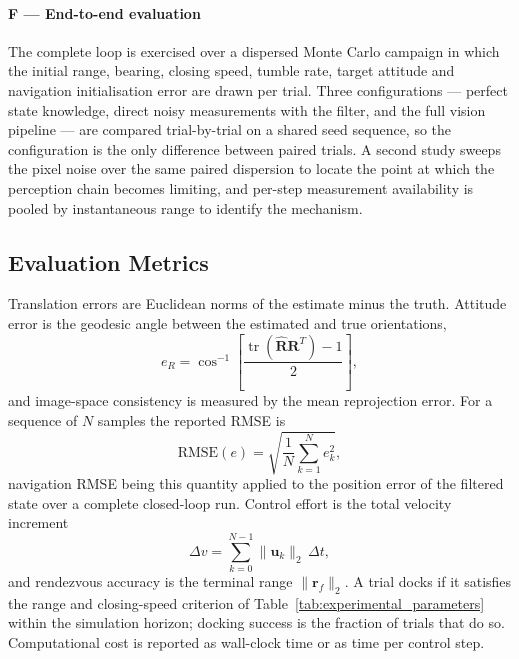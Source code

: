 \paragraph{F --- End-to-end evaluation}
The complete loop is exercised over a dispersed Monte Carlo campaign in which
the initial range, bearing, closing speed, tumble rate, target attitude and
navigation initialisation error are drawn per trial. Three configurations ---
perfect state knowledge, direct noisy measurements with the filter, and the
full vision pipeline --- are compared trial-by-trial on a shared seed
sequence, so the configuration is the only difference between paired trials. A
second study sweeps the pixel noise over the same paired dispersion to locate
the point at which the perception chain becomes limiting, and per-step
measurement availability is pooled by instantaneous range to identify the
mechanism.

\subsection{Evaluation Metrics}

Translation errors are Euclidean norms of the estimate minus the truth.
Attitude error is the geodesic angle between the estimated and true
orientations,
\begin{equation}
    e_{R}
    =
    \cos^{-1}
    \left[
    \frac{\operatorname{tr}(\hat{\mathbf{R}}\mathbf{R}^{T})-1}{2}
    \right],
\end{equation}
and image-space consistency is measured by the mean reprojection error. For a
sequence of $N$ samples the reported RMSE is
\begin{equation}
    \mathrm{RMSE}(e) = \sqrt{\frac{1}{N}\sum_{k=1}^{N}e_k^2},
\end{equation}
navigation RMSE being this quantity applied to the position error of the
filtered state over a complete closed-loop run. Control effort is the total
velocity increment
\begin{equation}
    \Delta v = \sum_{k=0}^{N-1}\|\mathbf{u}_k\|_2\,\Delta t,
\end{equation}
and rendezvous accuracy is the terminal range $\|\mathbf{r}_f\|_2$. A trial
docks if it satisfies the range and closing-speed criterion of
Table~\ref{tab:experimental_parameters} within the simulation horizon;
docking success is the fraction of trials that do so. Computational cost is
reported as wall-clock time or as time per control step.

